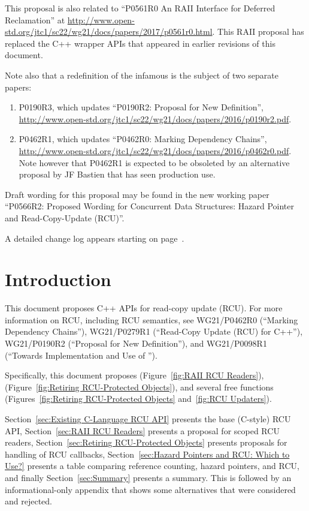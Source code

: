 \documentclass[letterpaper,10pt]{article}
\begin{document}
This proposal is also related to ``P0561R0 An RAII Interface for Deferred
Reclamation'' at
\url{http://www.open-std.org/jtc1/sc22/wg21/docs/papers/2017/p0561r0.html}.
This RAII proposal has replaced the C++ wrapper APIs that appeared in
earlier revisions of this document.

Note also that a redefinition of the infamous 
is the subject of two separate papers:

\begin{enumerate}
\item	P0190R3, which updates
	``P0190R2: Proposal for New  Definition'',
	\url{http://www.open-std.org/jtc1/sc22/wg21/docs/papers/2016/p0190r2.pdf}.
\item	P0462R1, which updates
	``P0462R0: Marking  Dependency Chains'',
	\url{http://www.open-std.org/jtc1/sc22/wg21/docs/papers/2016/p0462r0.pdf}.
	Note however that P0462R1 is expected to be obsoleted by
	an alternative proposal by JF Bastien that has seen production
	use.
\end{enumerate}

Draft wording for this proposal may be found in the new working paper
``P0566R2: Proposed Wording for Concurrent Data Structures: Hazard
Pointer and Read-Copy-Update (RCU)''.

A detailed change log appears starting on
page~\pageref{sec:Change Log}.

\section{Introduction}
\label{sec:Introduction}

This document proposes C++ APIs for read-copy update (RCU).
For more information on RCU, including RCU semantics, see
WG21/P0462R0 (``Marking  Dependency Chains''),
WG21/P0279R1 (``Read-Copy Update (RCU) for C++''),
WG21/P0190R2 (``Proposal for New  Definition''),
and
WG21/P0098R1 (``Towards Implementation and Use of '').

Specifically, this document proposes
 (Figure~\ref{fig:RAII RCU Readers}),
 (Figure~\ref{fig:Retiring RCU-Protected Objects}), and
several free functions
(Figures~\ref{fig:Retiring RCU-Protected Objects}
and~\ref{fig:RCU Updaters}).

Section~\ref{sec:Existing C-Language RCU API} presents the base (C-style) RCU API,
Section~\ref{sec:RAII RCU Readers} presents a proposal for scoped RCU readers,
Section~\ref{sec:Retiring RCU-Protected Objects} presents proposals for handling of
RCU callbacks,
Section~\ref{sec:Hazard Pointers and RCU: Which to Use?} presents a
table comparing reference counting, hazard pointers, and RCU, and finally
Section~\ref{sec:Summary} presents a summary.
This is followed by an informational-only appendix that shows
some alternatives that were considered and rejected.
\end{document}
